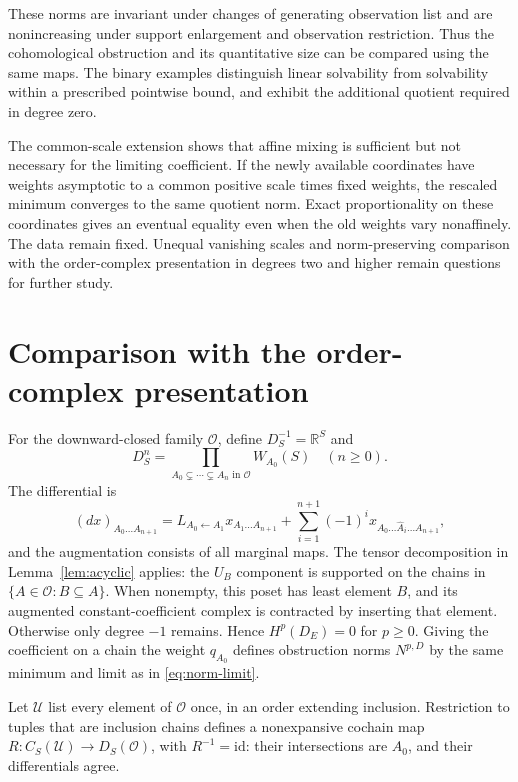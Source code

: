 \documentclass[11pt,a4paper]{article}
\numberwithin{equation}{section}
\theoremstyle{remark}
\newcommand{\R}{\mathbb R}
\newcommand{\OO}{\mathcal O}
\newcommand{\id}{\mathrm{id}}
\begin{document}
These norms are invariant under changes of generating observation list and are nonincreasing under support enlargement and observation restriction. Thus the cohomological obstruction and its quantitative size can be compared using the same maps. The binary examples distinguish linear solvability from solvability within a prescribed pointwise bound, and exhibit the additional quotient required in degree zero.

The common-scale extension shows that affine mixing is sufficient but not necessary for the limiting coefficient. If the newly available coordinates have weights asymptotic to a common positive scale times fixed weights, the rescaled minimum converges to the same quotient norm. Exact proportionality on these coordinates gives an eventual equality even when the old weights vary nonaffinely. The data remain fixed. Unequal vanishing scales and norm-preserving comparison with the order-complex presentation in degrees two and higher remain questions for further study.

\appendix
\section{Comparison with the order-complex presentation}\label{app:order}
For the downward-closed family $\OO$, define $D_S^{-1}=\R^S$ and
\[
 D_S^n=\prod_{A_0\subsetneq\cdots\subsetneq A_n\text{ in }\OO}W_{A_0}(S)\quad(n\ge0).
\]
The differential is
\begin{equation}\label{eq:order-differential}
 (d x)_{A_0\ldots A_{n+1}}
 =L_{A_0\leftarrow A_1}x_{A_1\ldots A_{n+1}}
 +\sum_{i=1}^{n+1}(-1)^i x_{A_0\ldots\widehat A_i\ldots A_{n+1}},
\end{equation}
and the augmentation consists of all marginal maps. The tensor decomposition in Lemma~\ref{lem:acyclic} applies: the $U_B$ component is supported on the chains in $\{A\in\OO:B\subseteq A\}$. When nonempty, this poset has least element $B$, and its augmented constant-coefficient complex is contracted by inserting that element. Otherwise only degree $-1$ remains. Hence $H^p(D_E)=0$ for $p\ge0$. Giving the coefficient on a chain the weight $q_{A_0}$ defines obstruction norms $N^{p,D}$ by the same minimum and limit as in \eqref{eq:norm-limit}.

Let $\mathcal U$ list every element of $\OO$ once, in an order extending inclusion. Restriction to tuples that are inclusion chains defines a nonexpansive cochain map $R:C_S(\mathcal U)\to D_S(\OO)$, with $R^{-1}=\id$: their intersections are $A_0$, and their differentials agree.
\end{document}
